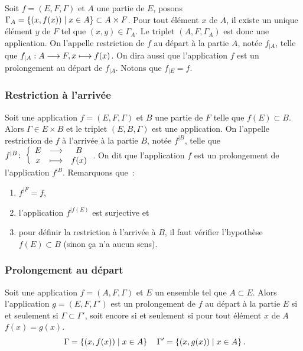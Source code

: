 Soit \(f = (E, F, \Gamma)\) et \(A\) une partie de \(E\), posons
\(\Gamma_A = \left\{(x, f(x))\mathrel{}\middle|\mathrel{}x \in{}A\right\} \subset{}A \times F\). Pour tout élément
\(x\) de \(A\), il existe un unique élément \(y\) de \(F\) tel que \((x, y) \in{}
\Gamma_A\). Le triplet \((A, F, \Gamma_A)\) est donc une application. On
l'appelle restriction de \(f\) au départ à la partie \(A\), notée \(f_{|A}\),
telle que \(f_{|A}:A \longrightarrow{} F, x \longmapsto{} f(x)\). On dira aussi que l'application
\(f\) est un prolongement au départ de \(f_{|A}\). Notons que \(f_{|E} = f\).

\subsubsection{Restriction à l'arrivée}\label{chap3-subsubsec:restrictionarr}

Soit une application \(f = (E, F, \Gamma)\) et \(B\) une partie de \(F\) telle
que \(f(E) \subset{}B\). Alors \(\Gamma \in{}E \times B\) et le triplet
\((E, B, \Gamma)\) est une application. On l'appelle restriction de \(f\) à
l'arrivée à la partie \(B\), notée \(f^{|B}\), telle que
\(f^{|B}\colon\left\{\begin{array}{ccc}E & \longrightarrow &B\\x & \longmapsto & f(x)\end{array}\right.\). On dit que l'application \(f\) est un
prolongement de l'application \(f^{|B}\). Remarquons que~:
\begin{enumerate}
  \item \(f^{|F} = f\),
  \item l'application \(f^{|f(E)}\) est surjective et
  \item pour définir la restriction à l'arrivée à \(B\), il faut vérifier
    l'hypothèse \(f(E) \subset{}B\) (sinon ça n'a aucun sens).
\end{enumerate}

\subsubsection{Prolongement au départ}\label{chap3-subsubsec:prolongementdep}

Soit une application \(f = (A, F, \Gamma)\) et \(E\) un ensemble tel que \(A \subset{}
E\). Alors l'application \(g = (E, F, \Gamma')\) est un prolongement de \(f\) au
départ à la partie \(E\) si et seulement si \(\Gamma \subset{}\Gamma'\), soit
encore si et seulement si pour tout élément \(x\) de \(A\) \(f(x) = g(x)\).
\begin{equation}\
  \Gamma = \left\{(x,f(x))\mathrel{}\middle|\mathrel{}x \in{}A\right\} \quad \Gamma' = \left\{(x,g(x))\mathrel{}\middle|\mathrel{}x \in{}A\right\}.
\end{equation}

